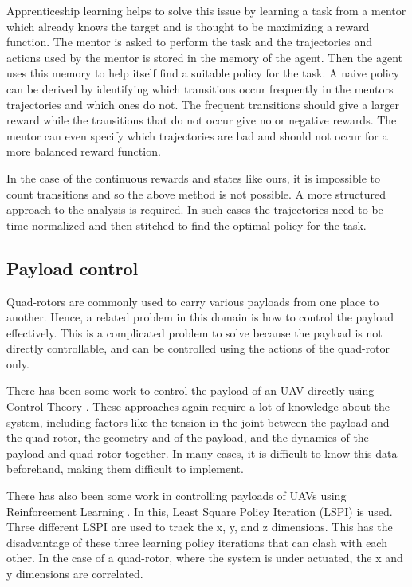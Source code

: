 \documentclass[hidelinks,BTech]{iitmdiss}
\begin{document}
Apprenticeship learning \cite{ApprenticeshipLearning} helps to solve this issue by learning a task from a mentor which already knows the target and is thought to be maximizing a reward function. The mentor is asked to perform the task and the trajectories and actions used by the mentor is stored in the memory of the agent. Then the agent uses this memory to help itself find a suitable policy for the task. A naive policy can be derived by identifying which transitions occur frequently in the mentors trajectories and which ones do not. The frequent transitions should give a larger reward while the transitions that do not occur give no or negative rewards. The mentor can even specify which trajectories are bad and should not occur for a more balanced reward function.

In the case of the continuous rewards and states like ours, it is impossible to count transitions and so the above method is not possible. A more structured approach to the analysis is required. In such cases the trajectories need to be time normalized and then stitched to find the optimal policy for the task.

\subsection{Payload control}

Quad-rotors are commonly used to carry various payloads from one place to another. Hence, a related problem in this domain is how to control the payload effectively. This is a complicated problem to solve because the payload is not directly controllable, and can be controlled using the actions of the quad-rotor only.

There has been some work to control the payload of an UAV directly using Control Theory \cite{PayloadControlTheory,PayloadControlTheory2}. These approaches again require a lot of knowledge about the system, including factors like the tension in the joint between the payload and the quad-rotor, the geometry and of the payload, and the dynamics of the payload and quad-rotor together. In many cases, it is difficult to know this data beforehand, making them difficult to implement.

There has also been some work in controlling payloads of UAVs using Reinforcement Learning \cite{PayloadLSPI}. In this, Least Square Policy Iteration (LSPI) is used. Three different LSPI are used to track the x, y, and z dimensions. This has the disadvantage of these three learning policy iterations that can clash with each other. In the case of a quad-rotor, where the system is under actuated, the x and y dimensions are correlated.
\end{document}
